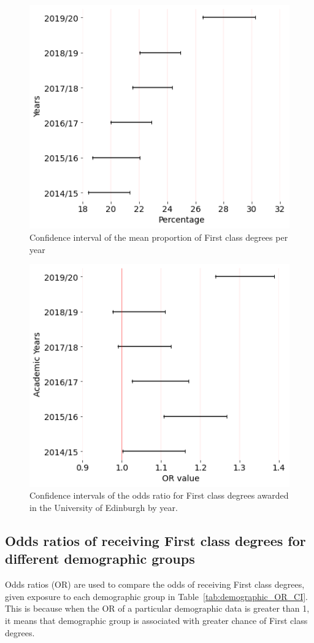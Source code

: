 \documentclass[11pt,a4paper]{article}
\begin{document}
\begin{figure}[t]
    \centering
    \includegraphics[scale=0.6]{figures/CI_First_Prop_plot.png}
    \caption{Confidence interval of the mean proportion of First class degrees per year}
    \label{first-class-prop-CI-plot}
\end{figure}

\begin{figure}[t]
    \centering
    \includegraphics[scale=0.6]{figures/CI_OR_UOE.png}
    \caption{Confidence intervals of the odds ratio for First class degrees awarded in the University of Edinburgh by year.}
    \label{CI_OR_UOE}
\end{figure}

\subsection{Odds ratios of receiving First class degrees for different demographic groups}
Odds ratios (OR) are used to compare the odds of receiving First class degrees, given exposure to each demographic group in Table~\ref{tab:demographic_OR_CI}. This is because when the OR of a particular demographic data is greater than 1, it means that demographic group is associated with greater chance of First class degrees.
\end{document}
